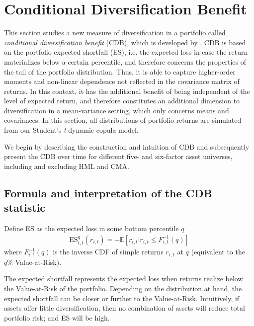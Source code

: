 
\section{Conditional Diversification Benefit} %
\label{sec:conditional_diversification_benefit}

This section studies a new measure of diversification in a portfolio called \emph{conditional diversification benefit} (CDB), which is developed by \textcite{ChristoffersenErrunzaJacobLanglois2012}. CDB is based on the portfolio expected shortfall (ES), i.e. the expected loss in case the return materializes below a certain percentile, and therefore concerns the properties of the tail of the portfolio distribution. Thus, it is able to capture higher-order moments and non-linear dependence not reflected in the covariance matrix of returns. In this context, it has the additional benefit of being independent of the level of expected return, and therefore constitutes an additional dimension to diversification in a mean-variance setting, which only concerns means and covariances. In this section, all distributions of portfolio returns are simulated from our Student's \textit{t} dynamic copula model.

We begin by describing the construction and intuition of CDB and subsequently present the CDB over time for different five- and six-factor asset universes, including and excluding HML and CMA.

\subsection{Formula and interpretation of the CDB statistic}

Define ES as the expected loss in some bottom percentile $q$
\begin{align}
    \text{ES}_{i,t}^q(r_{i,t}) = -\mathbb{E}[r_{i,t} | r_{i,t} \leq F_{i,t}^{-1}(q)]
\end{align}
where $F_{i,t}^{-1}(q)$ is the inverse CDF of simple returns $r_{i,t}$ at $q$ (equivalent to the $q\%$ Value-at-Risk). 

The expected shortfall represents the expected loss when returns realize below the Value-at-Risk of the portfolio. Depending on the distribution at hand, the expected shortfall can be closer or further to the Value-at-Risk. Intuitively, if assets offer little diversification, then no combination of assets will reduce total portfolio risk; and ES will be high. 

